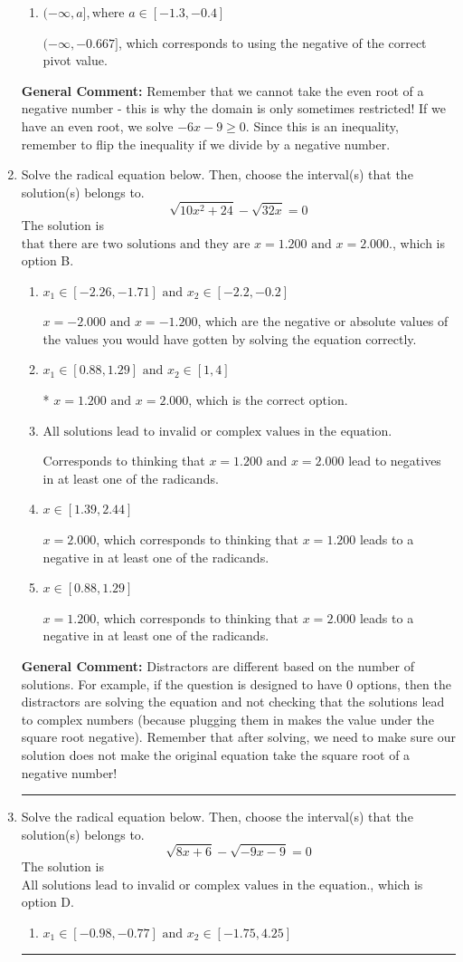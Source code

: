 \documentclass{extbook}[14pt]
\newcommand{\litem}[1]{\item #1

\rule{\textwidth}{0.4pt}}
\begin{document}
\begin{enumerate}
{\begin{enumerate}[label=\Alph*.]
* $(-\infty, -1.500]$, which is the correct option.
\item \( (-\infty, a], \text{where } a \in [-1.3, -0.4] \)

$(-\infty, -0.667]$, which corresponds to using the negative of the correct pivot value.
\end{enumerate}

\textbf{General Comment:} Remember that we cannot take the even root of a negative number - this is why the domain is only sometimes restricted! If we have an even root, we solve $-6 x - 9 \geq 0$. Since this is an inequality, remember to flip the inequality if we divide by a negative number.
}
\litem{
Solve the radical equation below. Then, choose the interval(s) that the solution(s) belongs to.
\[ \sqrt{10 x^2 + 24} - \sqrt{32 x} = 0 \]The solution is \( \text{that there are two solutions and they are } x = 1.200 \text{ and } x = 2.000. \), which is option B.\begin{enumerate}[label=\Alph*.]
\item \( x_1 \in [-2.26, -1.71] \text{ and } x_2 \in [-2.2,-0.2] \)

$x = -2.000 \text{ and } x = -1.200$, which are the negative or absolute values of the values you would have gotten by solving the equation correctly.
\item \( x_1 \in [0.88, 1.29] \text{ and } x_2 \in [1,4] \)

* $x = 1.200 \text{ and } x = 2.000$, which is the correct option.
\item \( \text{All solutions lead to invalid or complex values in the equation.} \)

Corresponds to thinking that $x = 1.200 \text{ and } x = 2.000$ lead to negatives in at least one of the radicands.
\item \( x \in [1.39,2.44] \)

$x = 2.000$, which corresponds to thinking that $x = 1.200$ leads to a negative in at least one of the radicands.
\item \( x \in [0.88,1.29] \)

$x = 1.200$, which corresponds to thinking that $x = 2.000$ leads to a negative in at least one of the radicands.
\end{enumerate}

\textbf{General Comment:} Distractors are different based on the number of solutions. For example, if the question is designed to have 0 options, then the distractors are solving the equation and not checking that the solutions lead to complex numbers (because plugging them in makes the value under the square root negative). Remember that after solving, we need to make sure our solution does not make the original equation take the square root of a negative number!
}
\litem{
Solve the radical equation below. Then, choose the interval(s) that the solution(s) belongs to.
\[ \sqrt{8 x + 6} - \sqrt{-9 x - 9} = 0 \]The solution is \( \text{All solutions lead to invalid or complex values in the equation.} \), which is option D.\begin{enumerate}[label=\Alph*.]
\item \( x_1 \in [-0.98, -0.77] \text{ and } x_2 \in [-1.75,4.25] \)


\end{enumerate}}
\end{enumerate}
\end{document}
